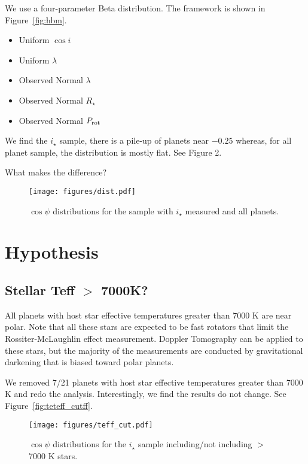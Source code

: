 \documentclass[twocolumn]{aastex631}
\begin{document}
We use a four-parameter Beta distribution. The framework is shown in Figure~\ref{fig:hbm}.

\begin{itemize}
    \item Uniform $\cos{i}$
    \item Uniform $\lambda$
    \item Observed Normal $\lambda$
    \item Observed Normal $R_\star$
    \item Observed Normal $P_{\rm rot}$
\end{itemize}

We find the $i_\star$ sample, there is a pile-up of planets near $-0.25$ whereas, for all planet sample, the distribution is mostly flat. See Figure 2.

What makes the difference?

\begin{figure*}[ht!]
    \begin{centering}
        \texttt{[image: figures/dist.pdf]}
        \caption{$\cos{\psi}$ distributions for the sample with $i_\star$ measured and all planets.}
        \label{fig:dist}
    \end{centering}
\end{figure*}

\section{Hypothesis} \label{sec:tests}

\subsection{Stellar Teff $>$ 7000K?}
All planets with host star effective temperatures greater than 7000 K are near polar.
Note that all these stars are expected to be fast rotators that limit the Rossiter-McLaughlin effect measurement. Doppler Tomography can be applied to these stars, but the majority of the measurements are conducted by gravitational darkening that is biased toward polar planets.

We removed 7/21 planets with host star effective temperatures greater than 7000 K and redo the analysis. Interestingly, we find the results do not change. See Figure~\ref{fig:teteff_cutff}.

\begin{figure*}[ht!]
    \begin{centering}
        \texttt{[image: figures/teff\_cut.pdf]}
        \caption{$\cos{\psi}$ distributions for the $i_\star$ sample including/not including $>$7000 K stars.}
        \label{fig:teff_cut}
    \end{centering}
\end{figure*}
\end{document}

